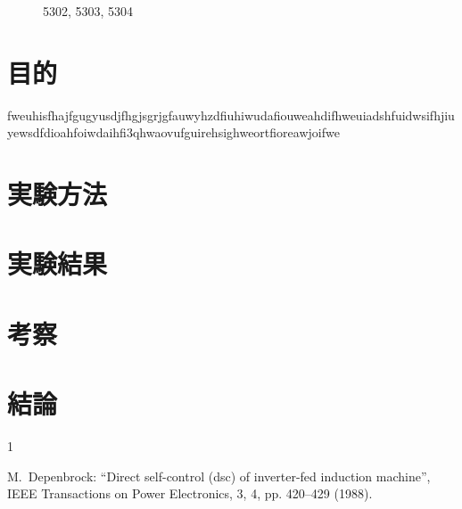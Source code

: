 \graphicspath{{./figure/}}  %

\begin{figure}[t!]
    \centering
    \begin{defbox}
        5302, 5303, 5304
    \end{defbox}
\end{figure}

\section{目的}
fweuhisfhajfgugyusdjfhgjsgrjgfauwyhzdfiuhiwudafiouweahdifhweuiadshfuidwsifhjiuyewsdfdioahfoiwdaihfi3qhwaovufguirehsighweortfioreawjoifwe\par
\section{実験方法}
\section{実験結果}
\section{考察}
\section{結論}




 {
  \vspace{1em}\fontsize{7.09pt}{10.63pt}\selectfont
  \renewcommand{\section}[2]{
      \begin{center}\textbf{◆~{#2}~◆}\end{center}
  }
  \begin{thebibliography}{1}

      M.~Depenbrock: ``Direct self-control (dsc) of inverter-fed induction machine'', IEEE Transactions on Power Electronics, \textsf{3}, 4, pp. 420--429 (1988).

  \end{thebibliography}
 }